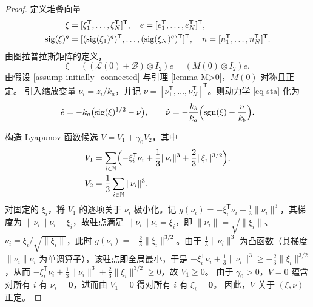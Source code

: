 \begin{proof}
    定义堆叠向量
    \begin{align*}
        \xi &= [\xi_1^\mathsf{T}, \dots, \xi_N^\mathsf{T}]^\mathsf{T},\quad 
        e = [e_1^\mathsf{T}, \dots, e_N^\mathsf{T}]^\mathsf{T},\\
        \operatorname{sig}(\xi)^q &=[(\operatorname{sig}(\xi_1)^q)^\mathsf{T}, \dots, (\operatorname{sig}(\xi_N)^q)^\mathsf{T}]^\mathsf{T},\quad 
        n = [n_1^\mathsf{T}, \dots, n_N^\mathsf{T}]^\mathsf{T}.
    \end{align*}
    由图拉普拉斯矩阵的定义，
    \begin{equation}\label{eq:2_error_relation}
        \xi = ((\mathcal{L}(0)+\mathcal{B})\otimes I_2)e = (M(0)\otimes I_2) e.
    \end{equation}
    由假设 \ref{assump initially_connected} 与引理 \ref{lemma M>0}，$M(0)$ 对称且正定。
    引入缩放变量 $\nu_i = z_i/k_a$，并记 $\nu = [\nu_1^\mathsf{T},\dots,\nu_N^\mathsf{T}]^\mathsf{T}$。则动力学 \eqref{eq sta} 化为
    \begin{equation}
        \dot{e} = -k_a\bigl(\operatorname{sig}(\xi)^{1/2} - \nu\bigr),\qquad
        \dot{\nu} = -\frac{k_b}{k_a}\Bigl(\operatorname{sgn}(\xi) - \frac{n}{k_b}\Bigr). \label{eq:compact}
    \end{equation}

    构造 Lyapunov 函数候选 $V = V_1 + \gamma_0 V_2$，其中
    \begin{align*}
        V_1 &=\sum_{i\in\mathbb{N}}\Bigl(-\xi_i^\mathsf{T}\nu_i + \frac{1}{3}\|\nu_i\|^3 + \frac{2}{3}\|\xi_i\|^{3/2}\Bigr),\\
        V_2 &= \frac{1}{3}\sum_{i\in\mathbb{N}}\|\nu_i\|^3.
    \end{align*}
    对固定的 $\xi_i$，将 $V_1$ 的逐项关于 $\nu_i$ 极小化。记 $g(\nu_i)=-\xi_i^\mathsf{T}\nu_i+\frac13\|\nu_i\|^3$，其梯度为 $\|\nu_i\|\nu_i-\xi_i$，故驻点满足 $\|\nu_i\|\nu_i=\xi_i$，即 $\|\nu_i\|=\sqrt{\|\xi_i\|}$、$\nu_i=\xi_i/\sqrt{\|\xi_i\|}$，此时 $g(\nu_i)=-\frac23\|\xi_i\|^{3/2}$。由于 $\frac13\|\nu_i\|^3$ 为凸函数（其梯度 $\|\nu_i\|\nu_i$ 为单调算子），该驻点即全局最小，于是 $-\xi_i^\mathsf{T}\nu_i+\frac13\|\nu_i\|^3\ge -\frac23\|\xi_i\|^{3/2}$，从而 $-\xi_i^\mathsf{T}\nu_i+\frac13\|\nu_i\|^3+\frac23\|\xi_i\|^{3/2}\ge 0$，故 $V_1\ge 0$。
    由于 $\gamma_0>0$，$V=0$ 蕴含对所有 $i$ 有 $\nu_i=\mathbf{0}$，进而由 $V_1=0$ 得对所有 $i$ 有 $\xi_i=\mathbf{0}$。
    因此，$V$ 关于 $(\xi,\nu)$ 正定。


\end{proof}
